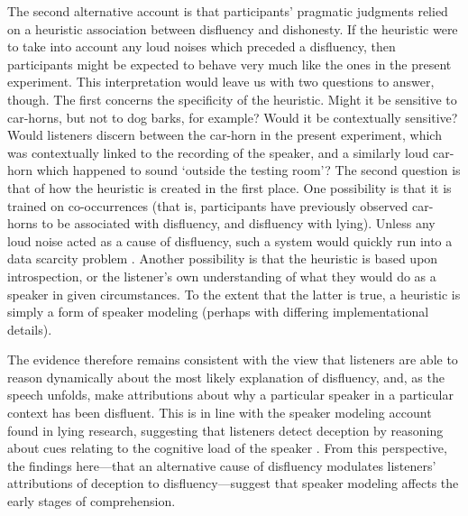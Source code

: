 \documentclass[a4paper,man,natbib]{apa6}
\begin{document}
The second alternative account is that participants' pragmatic judgments relied on a heuristic association between disfluency and dishonesty.
If the heuristic were to take into account any loud noises which preceded a disfluency, then participants might be expected to behave very much like the ones in the present experiment.
This interpretation would leave us with two questions to answer, though.
The first concerns the specificity of the heuristic.
Might it be sensitive to car-horns, but not to dog barks, for example?
Would it be contextually sensitive?
Would listeners discern between the car-horn in the present experiment, which was contextually linked to the recording of the speaker, and a similarly loud car-horn which happened to sound `outside the testing room'?
The second question is that of how the heuristic is created in the first place.
One possibility is that it is trained on co-occurrences (that is, participants have previously observed car-horns to be associated with disfluency, and disfluency with lying).
Unless any loud noise acted as a cause of disfluency, such a system would quickly run into a data scarcity problem \citep[see][for a similar argument concerning parsing]{Mitchell:ea:95}.
Another possibility is that the heuristic is based upon introspection, or the listener's own understanding of what they would do as a speaker in given circumstances.
To the extent that the latter is true, a heuristic is simply a form of speaker modeling (perhaps with differing implementational details).

The evidence therefore remains consistent with the view that listeners are able to reason dynamically about the most likely explanation of disfluency, and, as the speech unfolds, make attributions about why a particular speaker in a particular context has been disfluent.
This is in line with the speaker modeling account found in lying research, suggesting that listeners detect deception by reasoning about cues relating to the cognitive load of the speaker \citep{Zuckerman1981,depaulo2003cues}.
From this perspective, the findings here---that an alternative cause of disfluency modulates listeners' attributions of deception to disfluency---suggest that speaker modeling affects the early stages of comprehension.

\end{document}
